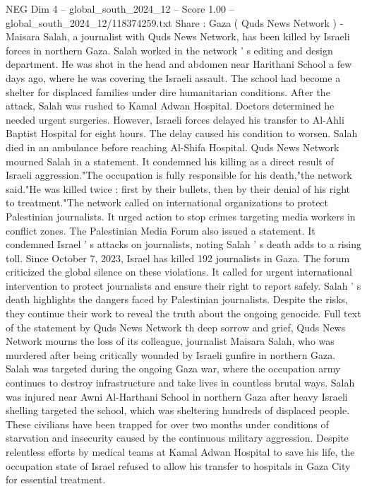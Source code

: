 \begin{textsample}{NEG Dim 4 – global\_south\_2024\_12 – Score 1.00 – global\_south\_2024\_12/118374259.txt}  \label{ex:f4_neg_222}
Share : Gaza ( Quds News Network ) - Maisara Salah, a journalist with Quds News Network, has been killed by Israeli forces in northern Gaza.
Salah worked in the network ' s editing and design department.
He was shot in the head and abdomen near Harithani School a few days ago, where he was covering the Israeli assault.
The school had become a shelter for displaced families under dire humanitarian conditions.
After the attack, Salah was rushed to Kamal Adwan Hospital.
Doctors determined he needed urgent surgeries.
However, Israeli forces delayed his transfer to Al-Ahli Baptist Hospital for eight hours.
The delay caused his condition to worsen.
Salah died in an ambulance before reaching Al-Shifa Hospital.
Quds News Network mourned Salah in a statement.
It condemned his killing as a direct result of Israeli aggression."The occupation is fully responsible for his death,"the network said."He was killed twice : first by their bullets, then by their denial of his right to treatment."The network called on international organizations to protect Palestinian journalists.
It urged action to stop crimes targeting media workers in conflict zones.
The Palestinian Media Forum also issued a statement.
It condemned Israel ' s attacks on journalists, noting Salah ' s death adds to a rising toll.
Since October 7, 2023, Israel has killed 192 journalists in Gaza.
The forum criticized the global silence on these violations.
It called for urgent international intervention to protect journalists and ensure their right to report safely.
Salah ' s death highlights the dangers faced by Palestinian journalists.
Despite the risks, they continue their work to reveal the truth about the ongoing genocide.
Full text of the statement by Quds News Network th deep sorrow and grief, Quds News Network mourns the loss of its colleague, journalist Maisara Salah, who was murdered after being critically wounded by Israeli gunfire in northern Gaza.
Salah was targeted during the ongoing Gaza war, where the occupation army continues to destroy infrastructure and take lives in countless brutal ways.
Salah was injured near Awni Al-Harthani School in northern Gaza after heavy Israeli shelling targeted the school, which was sheltering hundreds of displaced people.
These civilians have been trapped for over two months under conditions of starvation and insecurity caused by the continuous military aggression.
Despite relentless efforts by medical teams at Kamal Adwan Hospital to save his life, the occupation state of Israel refused to allow his transfer to hospitals in Gaza City for essential treatment.

\end{textsample}
